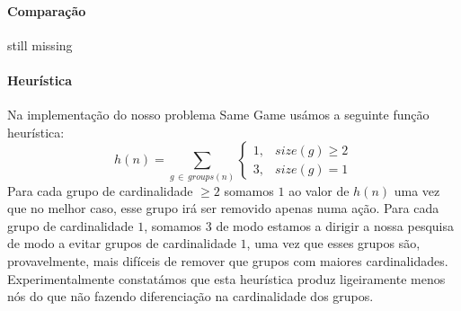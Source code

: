 \documentclass[a4paper]{article}
\begin{document}
    \paragraph{Comparação}
    still missing

    \paragraph{Heurística}
    Na implementação do nosso problema Same Game usámos a seguinte função heurística:
    \[
        h(n) = \sum_{g\, \in\, groups(n)}
        \begin{cases}
            1, & size(g) \geq 2 \\
            3, & size(g) = 1
        \end{cases}
    \]
    Para cada grupo de cardinalidade $\geq 2$ somamos $1$ ao valor de $h(n)$ uma vez que no melhor caso, esse grupo irá ser removido
    apenas numa ação. Para cada grupo de cardinalidade $1$, somamos $3$ de modo estamos a dirigir a nossa pesquisa de modo a evitar
    grupos de cardinalidade $1$, uma vez que esses grupos são, provavelmente, mais difíceis de remover que grupos com maiores cardinalidades.
    Experimentalmente constatámos que esta heurística produz ligeiramente menos nós do que não fazendo diferenciação na
    cardinalidade dos grupos.

    \paragraph{}
\end{document}
